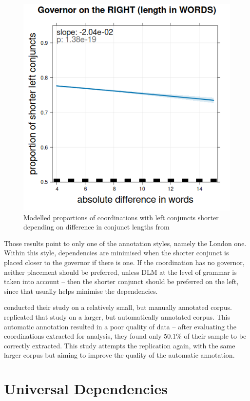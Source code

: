 \begin{figure}[H]
    \includegraphics[scale=0.27]{inputs/coca-R.png}
    \caption{Modelled proportions of coordinations with left conjuncts shorter depending on difference in conjunct lengths from \cite{pbg2023}}\label{fig:pbg24-results}
\end{figure}

Those results point to only one of the annotation styles, namely the London one. Within this style, dependencies are minimised when the shorter conjunct is placed closer to the governor if there is one. If the coordination has no governor, neither placement should be preferred, unless DLM at the level of grammar is taken into account -- then the shorter conjunct should be preferred on the left, since that usually helps minimise the dependencies.

\cite{prz:woz:23} conducted their study on a relatively small, but manually annotated corpus. \cite{pbg2023} replicated that study on a larger, but automatically annotated corpus. This automatic annotation resulted in a poor quality of data -- after evaluating the coordinations extracted for analysis, they found only 50.1\% of their sample to be correctly extracted. This study attempts the replication again, with the same larger corpus but aiming to improve the quality of the automatic annotation.

\section{Universal Dependencies}\label{sec:ud}

